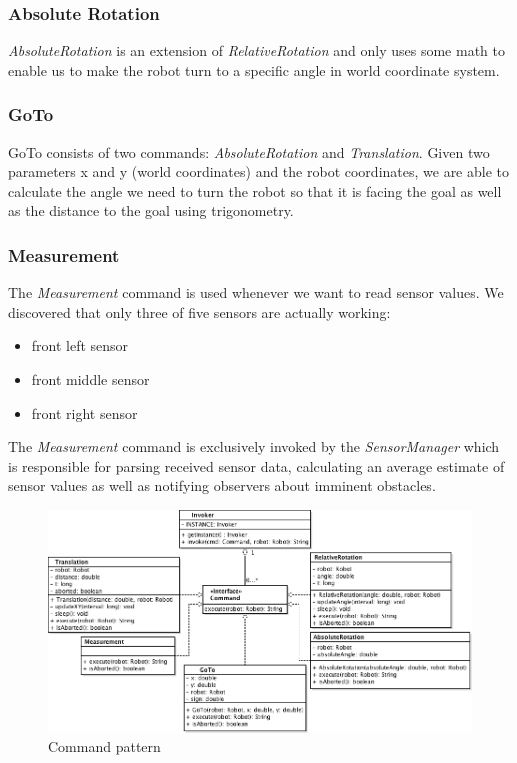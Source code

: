 \documentclass[703030]{./includes/iisreport}
\begin{document}
\subsubsection{Absolute Rotation}
\emph{AbsoluteRotation} is an extension of \emph{RelativeRotation} and only uses 
some math to enable us to make the robot turn to a specific angle in world 
coordinate system.

\subsubsection{GoTo}
GoTo consists of two commands: \emph{AbsoluteRotation} and \emph{Translation}. 
Given two parameters x and y (world coordinates) and the robot coordinates, we are
able to calculate the angle we need to turn the robot so that it is facing the goal
as well as the distance to the goal using trigonometry.

\subsubsection{Measurement}
The \emph{Measurement} command is used whenever we want to read sensor values. We
discovered that only three of five sensors are actually working:
\begin{itemize}
	\item front left sensor
	\item front middle sensor
	\item front right sensor
\end{itemize}
The \emph{Measurement} command is exclusively invoked by the \emph{SensorManager}
which is responsible for parsing received sensor data, calculating an average estimate
of sensor values as well as notifying observers about imminent obstacles.

\begin{figure}
	\centering
	\includegraphics[width=\textwidth,height=\textheight,keepaspectratio]{./graphics/commandpattern.png}
	\caption{Command pattern}
	\label{img:commandpattern}
\end{figure}
\end{document}
